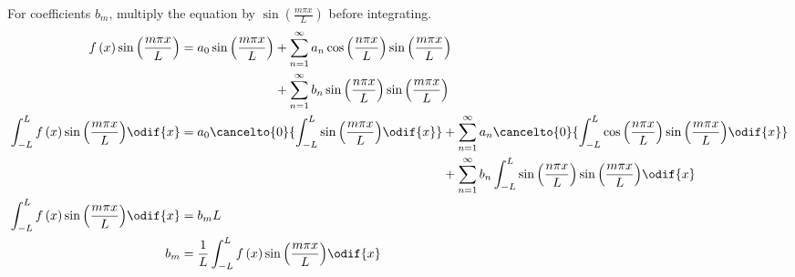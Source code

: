 \documentclass{article}
\begin{document}
For coefficients \(b_m\), multiply the equation by \(\sin{\left( \frac{m \pi x}{L} \right)}\) before integrating.
\begin{align*}
    f\left( x \right) \sin{\left( \frac{m \pi x}{L} \right)}                      & = \begin{aligned}[t]
                                                                                          a_0 \sin{\left( \frac{m \pi x}{L} \right)} & + \sum_{n = 1}^\infty a_n \cos{\left( \frac{n \pi x}{L} \right)} \sin{\left( \frac{m \pi x}{L} \right)} \\
                                                                                                                                     & + \sum_{n = 1}^\infty b_n \sin{\left( \frac{n \pi x}{L} \right)} \sin{\left( \frac{m \pi x}{L} \right)}
                                                                                      \end{aligned}                                                                                                      \\
    \int_{-L}^L f\left( x \right) \sin{\left( \frac{m \pi x}{L} \right)} \odif{x} & = \begin{aligned}[t]
                                                                                          a_0 \cancelto{0}{\int_{-L}^L \sin{\left( \frac{m \pi x}{L} \right)} \odif{x}} & + \sum_{n = 1}^\infty a_n \cancelto{0}{\int_{-L}^L \cos{\left( \frac{n \pi x}{L} \right)} \sin{\left( \frac{m \pi x}{L} \right)} \odif{x}} \\
                                                                                                                                                                        & + \sum_{n = 1}^\infty b_n \int_{-L}^L \sin{\left( \frac{n \pi x}{L} \right)} \sin{\left( \frac{m \pi x}{L} \right)} \odif{x}
                                                                                      \end{aligned} \\
    \int_{-L}^L f\left( x \right) \sin{\left( \frac{m \pi x}{L} \right)} \odif{x} & = b_m L                                                                                                                                                                                                                                   \\
    b_m                                                                           & = \frac{1}{L} \int_{-L}^L f\left( x \right) \sin{\left( \frac{m \pi x}{L} \right)} \odif{x}
\end{align*}
\end{document}
